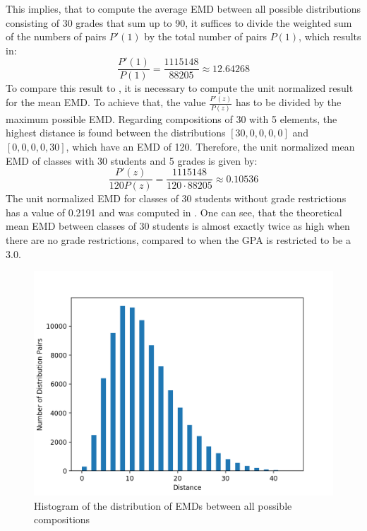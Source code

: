 \documentclass[12pt,letterpaper,oneside,openany]{book}
\begin{document}
This implies, that to compute the average EMD between all possible distributions consisting of 30 grades that sum up to 90, it suffices to divide the weighted sum of the numbers of pairs $P'(1)$ by the total number of pairs $P(1)$, which results in:
$$\frac{P'(1)}{P(1)}=\frac{1115148}{88205} \approx 12.64268$$
To compare this result to \cite{bourn2019expected}, it is necessary to compute the unit normalized result for the mean EMD. To achieve that, the value $\frac{P'(z)}{P(z)}$ has to be divided by the maximum possible EMD. Regarding compositions of 30 with 5 elements, the highest distance is found between the distributions  $[30, 0, 0, 0, 0]$ and $[0, 0, 0, 0, 30]$, which have an EMD of 120.
Therefore, the unit normalized mean EMD of classes with 30 students and 5 grades is given by:
$$\frac{P'(z)}{120P(z)} = \frac{1115148}{120\cdot 88205} \approx 0.10536$$
The unit normalized EMD for classes of 30 students without grade restrictions has a value of 0.2191 and was computed in \cite{bourn2019expected}. 
One can see, that the theoretical mean EMD between classes of 30 students is almost exactly twice as high when there are no grade restrictions, compared to when the GPA is restricted to be a 3.0.

\begin{figure}
	\centering
	\includegraphics[width=\textwidth]{./images/histogram.png}
	\caption{Histogram of the distribution of EMDs between all possible compositions}
	\label{fig:comphist}
\end{figure}


\setcounter{chapter}{4}
\setcounter{table}{0}
\end{document}
